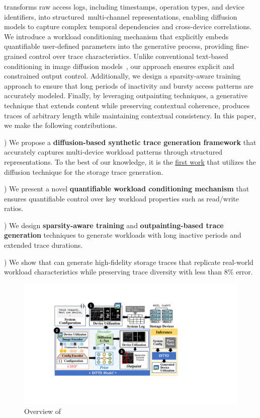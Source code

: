 \documentclass[
  manuscript=article,  %
  layout=preprint,  %
  year=20xx,
  volume=x,
]{extra/joas}
\begin{document}
\Design transforms raw access logs, including timestamps, operation types, and device identifiers, into structured\ multi-channel representations, enabling diffusion models to capture complex temporal dependencies and cross-device correlations. We introduce a workload conditioning mechanism that explicitly embeds quantifiable user-defined parameters into the generative process, providing fine-grained control over trace characteristics. Unlike conventional text-based conditioning in image diffusion models~\cite{dalle2}, our approach ensures explicit and constrained output control. Additionally, we design a sparsity-aware training approach to ensure that long periods of inactivity and bursty access patterns are accurately modeled. Finally, by leveraging outpainting techniques, a generative technique that extends content while preserving contextual coherence, \Design produces traces of arbitrary length while maintaining contextual consistency. In this paper, we make the following contributions.


) We propose a \textbf{diffusion-based synthetic trace generation framework} that accurately captures multi-device workload patterns through structured representations. To the best of our knowledge, it is the \underline{first work} that utilizes the diffusion technique for the storage trace generation. 

) We present a novel \textbf{quantifiable workload conditioning mechanism} that ensures quantifiable control over key workload properties such as read/write ratios.

) We design \textbf{sparsity-aware training} and \textbf{outpainting-based trace generation} techniques to generate workloads with long inactive periods and extended trace durations.

) We show that \Design can generate high-fidelity storage traces that replicate real-world workload characteristics while preserving trace diversity with less than 8\% error.

\begin{figure}
    \centering
    \includegraphics[width=0.9\columnwidth]{figure/overview.pdf}
    \caption{Overview of \Design}
    \label{fig:overview}
\end{figure}
\end{document}
